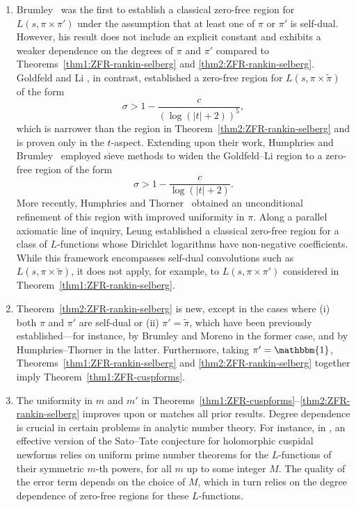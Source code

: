 \documentclass[12pt,reqno]{amsart}
\renewcommand{\tilde}{\widetilde}
\theoremstyle{remark}
\renewcommand{\tilde}{\widetilde}
\renewcommand{\tilde}{\widetilde}
\numberwithin{equation}{section}
\begin{document}
    \begin{enumerate}
        \item Brumley~\cite[Theorem A.1]{Humphries-Brumley} was the first to establish a classical zero-free region for $L(s, \pi \times \pi')$ under the assumption that at least one of $\pi$ or $\pi'$ is self-dual. However, his result does not include an explicit constant and exhibits a weaker dependence on the degrees of $\pi$ and $\pi'$ compared to Theorems~\ref{thm1:ZFR-rankin-selberg} and \ref{thm2:ZFR-rankin-selberg}. Goldfeld and Li \cite[Theorem 1.2]{GL}, in contrast, established a zero-free region for $L(s, \pi \times \tilde{\pi})$ of the form  
        \[
        \sigma > 1 - \frac{c}{(\log(|t| + 2))^5},
        \]
        which is narrower than the region in Theorem~\ref{thm2:ZFR-rankin-selberg} and is proven only in the $t$-aspect. 
        Extending upon their work, Humphries and Brumley~\cite[Theorem 1.9]{Humphries-Brumley} employed sieve methods to widen the Goldfeld--Li region to a zero-free region of the form 
        \[
        \sigma > 1 - \frac{c}{\log(|t| + 2)}.
        \]
        More recently, Humphries and Thorner~\cite[Theorem 2.1]{Humphries-Thorner} obtained an unconditional refinement of this region with improved uniformity in $\pi$. Along a parallel axiomatic line of inquiry, Leung \cite[Theorem 2.1]{Leung} established a classical zero-free region for a class of $L$-functions whose Dirichlet logarithms have non-negative coefficients. While this framework encompasses self-dual convolutions such as $L(s,\pi\times\tilde{\pi})$, it does not apply, for example, to $L(s,\pi\times\pi')$ considered in Theorem~\ref{thm1:ZFR-rankin-selberg}.
        \item 
        Theorem~\ref{thm2:ZFR-rankin-selberg} is new, except in the cases where (i) both $\pi$ and $\pi'$  are self-dual or (ii) $\pi' = \tilde{\pi}$, which have been previously established—for instance, by Brumley \cite[Theorem A.1]{Humphries-Brumley} and Moreno \cite[Theorem 3.3]{moreno} in the former case, and by Humphries--Thorner \cite[Theorem 2.1]{Humphries-Thorner} in the latter. 
        Furthermore, taking  $\pi'=\mathbbm{1}$,
        Theorems~\ref{thm1:ZFR-rankin-selberg} and \ref{thm2:ZFR-rankin-selberg} together imply Theorem~\ref{thm1:ZFR-cuspforms}.


        \item
            The uniformity in $m$ and $m'$ in Theorems~\ref{thm1:ZFR-cuspforms}--\ref{thm2:ZFR-rankin-selberg} improves upon or matches all prior results. %
           Degree dependence is crucial in certain problems in analytic number theory. For instance, in \cite{Sato-Tate-2}, an effective version of the Sato--Tate conjecture for holomorphic cuspidal newforms relies on uniform prime number theorems for the $L$-functions of their symmetric $m$-th powers, for all $m$ up to some integer $M$. The quality of the error term depends on the choice of $M$, which in turn relies on the degree dependence of zero-free regions for these $L$-functions.
            

\end{enumerate}
\end{document}
